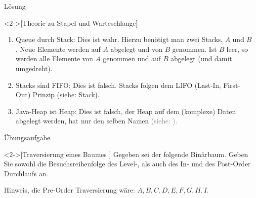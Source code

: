 \begin{frame}[c]{Lösung}
    \begin{solve}<2->[Theorie zu Stapel und Warteschlange]
        \pause{}\begin{enumerate}[<+(1)->]
            \item Queue durch Stack:\pause{} Dies ist wahr. Hierzu benötigt man zwei Stacks, \(A\) und \(B\).\pause{} Neue Elemente werden auf \(A\) abgelegt und von \(B\) genommen.\pause{} Ist \(B\) leer, so werden alle Elemente von \(A\) genommen und auf \(B\) abgelegt (und damit umgedreht).
            \item Stacks sind FIFO:\pause{} Dies ist falsch.\pause{} Stacks folgen dem LIFO (Last-In, First-Out) Prinzip (siehe: \hyperlink{mrk:Stack}{Stack}).
            \item Java-Heap ist Heap:\pause{} Dies ist falsch, der Heap auf dem (komplexe) Daten abgelegt werden,\pause{} hat nur den selben Namen \textcolor{gray}{(siehe: ).}
        \end{enumerate}
    \end{solve}
\end{frame}

\begin{frame}[c]{Übungsaufgabe}
    \begin{exercise}<2->[Traversierung eines Baumes ]
        \pause{}Gegeben sei der folgende Binärbaum. Geben Sie sowohl die Besuchsreihenfolge des Level-, als auch des In- und des Post-Order Durchlaufs an.\pause{}
        \begin{center}
        \end{center}
        \pause{}Hinweis, die Pre-Order Traversierung wäre: \(A,B,C,D,E,F,G,H,I\).
    \end{exercise}
\end{frame}

